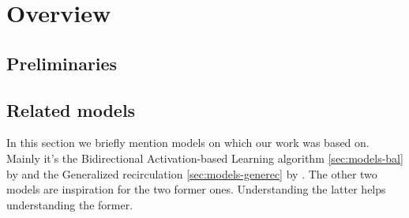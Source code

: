 



\section{Overview}
\label{sec:overview} 

\subsection{Preliminaries}
\label{sec:theory} 

 



\subsection{Related models} %
\label{sec:overview-models}  

In this section we briefly mention models on which our work was based on. Mainly it's the Bidirectional Activation-based Learning algorithm \ref{sec:models-bal} by \citet{farkas2013bal} and the Generalized recirculation \ref{sec:models-generec} by \citet{o1996bio}. The other two models are inspiration for the two former ones. Understanding the latter helps understanding the former. 










 
